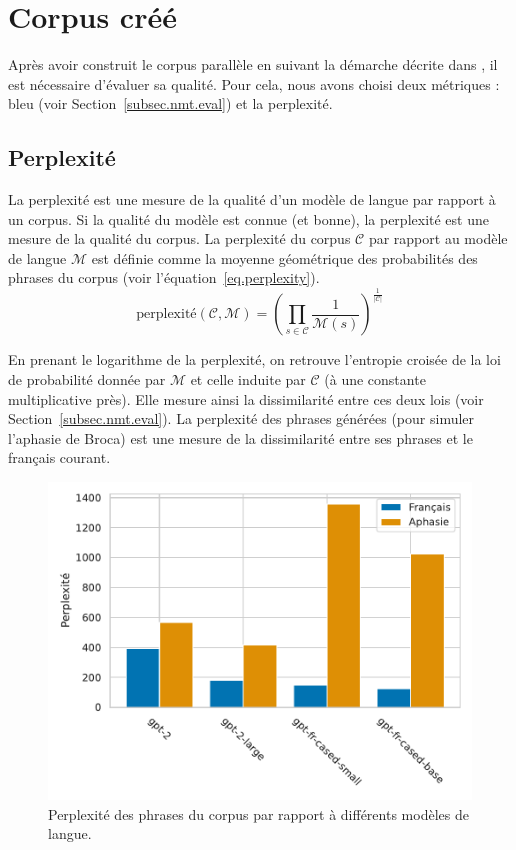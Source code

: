 \section{Corpus créé}%
\label{sec.results.corpus}

Après avoir construit le corpus parallèle en suivant la démarche décrite dans 
,
il est nécessaire d'évaluer sa qualité.
Pour cela, nous avons choisi deux métriques : \gls{bleu} (voir Section~\ref{subsec.nmt.eval})
et la perplexité.

\subsection{Perplexité}%
\label{subsec.results.corpus.perplexity}

La perplexité est une mesure de la qualité d'un modèle de langue par rapport à un corpus.
Si la qualité du modèle est connue (et bonne), la perplexité est une mesure de la qualité du corpus.
La perplexité du corpus \(\mathcal{C}\) par rapport au modèle de langue \(\mathcal{M}\) est définie
comme la moyenne géométrique des probabilités des phrases du corpus (voir l'équation~\ref{eq.perplexity}).
\begin{equation}
  \label{eq.perplexity}
  \text{perplexité}(\mathcal{C}, \mathcal{M}) = 
  \left(\prod_{s\in\mathcal{C}}\frac{1}{\mathcal{M}(s)}\right)^{\frac{1}{|\mathcal{C}|}}
\end{equation}

En prenant le logarithme de la perplexité, 
on retrouve l'entropie croisée de la loi de probabilité donnée par \(\mathcal{M}\) 
et celle induite par \(\mathcal{C}\) (à une constante multiplicative près).
Elle mesure ainsi la dissimilarité entre ces deux lois (voir Section~\ref{subsec.nmt.eval}).
La perplexité des phrases générées (pour simuler l'aphasie de Broca) 
est une mesure de la dissimilarité entre ses phrases et le français courant.


\begin{figure}[hbt]
  \begin{center}
    \includegraphics[width=.8\textwidth]{assets/python/perplexity.pdf}
  \end{center}
  \caption{Perplexité des phrases du corpus par rapport à différents modèles de langue.}
  \label{fig.perplexity}
\end{figure}

